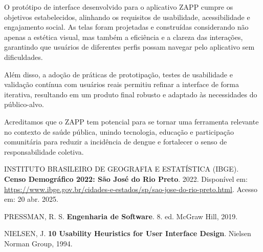 \documentclass[a5paper, 12pt]{article}
\begin{document}
O protótipo de interface desenvolvido para o aplicativo ZAPP cumpre os objetivos estabelecidos, alinhando os requisitos de usabilidade, acessibilidade e engajamento social. As telas foram projetadas e construídas considerando não apenas a estética visual, mas também a eficiência e a clareza das interações, garantindo que usuários de diferentes perfis possam navegar pelo aplicativo sem dificuldades.  

Além disso, a adoção de práticas de prototipação, testes de usabilidade e validação contínua com usuários reais permitiu refinar a interface de forma iterativa, resultando em um produto final robusto e adaptado às necessidades do público-alvo.  

Acreditamos que o ZAPP tem potencial para se tornar uma ferramenta relevante no contexto de saúde pública, unindo tecnologia, educação e participação comunitária para reduzir a incidência de dengue e fortalecer o senso de responsabilidade coletiva.


\begin{thebibliography}{09}
 INSTITUTO BRASILEIRO DE GEOGRAFIA E ESTATÍSTICA (IBGE). 
\textbf{Censo Demográfico 2022: São José do Rio Preto}. 
2022. 
Disponível em: \url{https://www.ibge.gov.br/cidades-e-estados/sp/sao-jose-do-rio-preto.html}. 
Acesso em: 20 abr. 2025.

 PRESSMAN, R. S. 
\textbf{Engenharia de Software}. 
8. ed. McGraw Hill, 2019.

 NIELSEN, J. 
\textbf{10 Usability Heuristics for User Interface Design}. 
Nielsen Norman Group, 1994.
\end{thebibliography}
\end{document}
